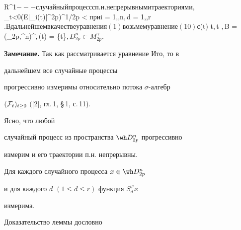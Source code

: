 \times \Omega \to R^1$ ---


случайный процесс с п.н. непрерывными траекториями,


$\sup \limits _{t<0}{(E|\varphi _i(t)|^{2p})}^{1/2p} < \infty $ при


$i = 1,\dotsc,n$, $d = 1,\dotsc,r$.





В дальнейшем в качестве уравнения (1) возьмем


уравнение (10) с $\xi(t) \equiv t$,


$t $, $B = (\Lambda _{2p,\infty }^n)^\gamma$,


$\gamma (t) = \exp \{\beta t\}$, $\beta \in [0, \ov \alpha [$,


$B^1 = {(L^n_\infty )}^\gamma = \{f: f \in L^n_\infty,


\ \gamma f \in L^n_\infty \}$ --- линейное пространство с нормой


$\|f\|_{B^1} = \|\gamma f\|_{L^n_\infty }$.


Тогда по теореме 3 из [4] $D_{2p}^n \subset M_{2p}^\gamma$.


\medskip





{\bf Замечание.} Так как рассматривается уравнение Ито, то в


дальнейшем все случайные процессы


прогрессивно измеримы относительно потока $\sigma $-алгебр


$({\cal F}_t)_{t\ge 0}$ ([2], гл.\,1, \S\,1, с.\,11).


Ясно, что любой


случайный процесс из пространства $\wh D_{2p}^n$ прогрессивно


измерим и его траектории п.н. непрерывны.





\begin{lem}


Для каждого случайного процесса $x \in \wh D_{2p}^n$


и для каждого $d$ $(1 \le d \le r)$ функция $S_d^\varphi x$


измерима.


\end{lem}





Доказательство леммы дословно


